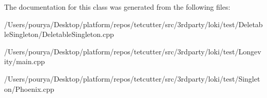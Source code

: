 The documentation for this class was generated from the following files\+:\begin{DoxyCompactItemize}
\item 
/\+Users/pourya/\+Desktop/platform/repos/tetcutter/src/3rdparty/loki/test/\+Deletable\+Singleton/Deletable\+Singleton.\+cpp\item 
/\+Users/pourya/\+Desktop/platform/repos/tetcutter/src/3rdparty/loki/test/\+Longevity/main.\+cpp\item 
/\+Users/pourya/\+Desktop/platform/repos/tetcutter/src/3rdparty/loki/test/\+Singleton/Phoenix.\+cpp\end{DoxyCompactItemize}
